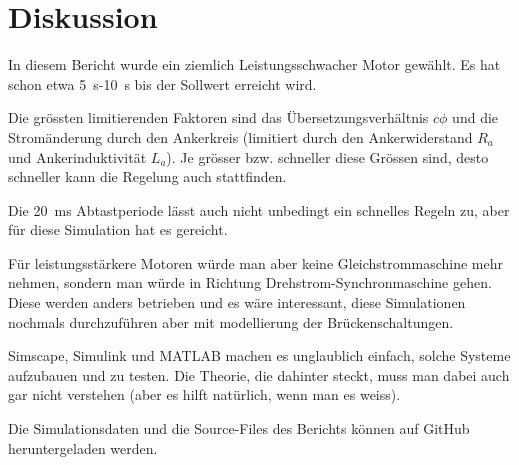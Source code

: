 \section{Diskussion}

In  diesem  Bericht wurde ein ziemlich Leistungsschwacher Motor gew\"ahlt.  Es
hat  schon  etwa  \SI{5}{\second}-\SI{10}{\second}  bis der Sollwert  erreicht
wird.

Die  gr\"ossten  limitierenden  Faktoren sind  das  \"Ubersetzungsverh\"altnis
$c\phi$ und die Strom\"anderung durch  den  Ankerkreis  (limitiert  durch  den
Ankerwiderstand  $R_a$  und  Ankerinduktivit\"at  $L_a$).  Je  gr\"osser  bzw.
schneller  diese  Gr\"ossen  sind,  desto  schneller  kann die  Regelung  auch
stattfinden.

Die  \SI{20}{\milli\second}  Abtastperiode l\"asst auch  nicht  unbedingt  ein
schnelles   Regeln   zu,   aber  f\"ur  diese  Simulation  hat  es   gereicht.

F\"ur  leistungsst\"arkere Motoren w\"urde man aber keine  Gleichstrommaschine
mehr nehmen, sondern man w\"urde in Richtung Drehstrom-Synchronmaschine gehen.
Diese werden anders  betrieben  und  es w\"are interessant, diese Simulationen
nochmals  durchzuf\"uhren  aber  mit  modellierung  der  Br\"uckenschaltungen.

Simscape,  Simulink  und MATLAB machen es unglaublich einfach, solche  Systeme
aufzubauen  und  zu  testen.  Die Theorie, die dahinter steckt, muss man dabei
auch  gar  nicht  verstehen  (aber  es  hilft nat\"urlich, wenn man es weiss).

Die  Simulationsdaten  und   die   Source-Files   des  Berichts  k\"onnen  auf
GitHub\cite{ref:TheComet93} heruntergeladen werden.
